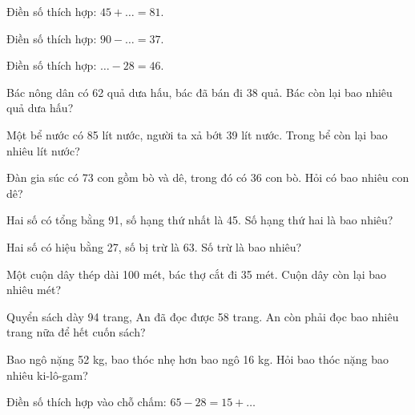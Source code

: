 \begin{ex}
Điền số thích hợp: $45 + \dots = 81$.
\end{ex}

\begin{ex}
Điền số thích hợp: $90 - \dots = 37$.
\end{ex}

\begin{ex}
Điền số thích hợp: $\dots - 28 = 46$.
\end{ex}

\begin{ex}
Bác nông dân có 62 quả dưa hấu, bác đã bán đi 38 quả. Bác còn lại bao nhiêu quả dưa hấu?
\end{ex}

\begin{ex}
Một bể nước có 85 lít nước, người ta xả bớt 39 lít nước. Trong bể còn lại bao nhiêu lít nước?
\end{ex}

\begin{ex}
Đàn gia súc có 73 con gồm bò và dê, trong đó có 36 con bò. Hỏi có bao nhiêu con dê?
\end{ex}

\begin{ex}
Hai số có tổng bằng 91, số hạng thứ nhất là 45. Số hạng thứ hai là bao nhiêu?
\end{ex}

\begin{ex}
Hai số có hiệu bằng 27, số bị trừ là 63. Số trừ là bao nhiêu?
\end{ex}

\begin{ex}
Một cuộn dây thép dài 100 mét, bác thợ cắt đi 35 mét. Cuộn dây còn lại bao nhiêu mét?
\end{ex}

\begin{ex}
Quyển sách dày 94 trang, An đã đọc được 58 trang. An còn phải đọc bao nhiêu trang nữa để hết cuốn sách?
\end{ex}

\begin{ex}
Bao ngô nặng 52 kg, bao thóc nhẹ hơn bao ngô 16 kg. Hỏi bao thóc nặng bao nhiêu ki-lô-gam?
\end{ex}

\begin{ex}
Điền số thích hợp vào chỗ chấm: $65 - 28 = 15 + \dots$
\end{ex}
